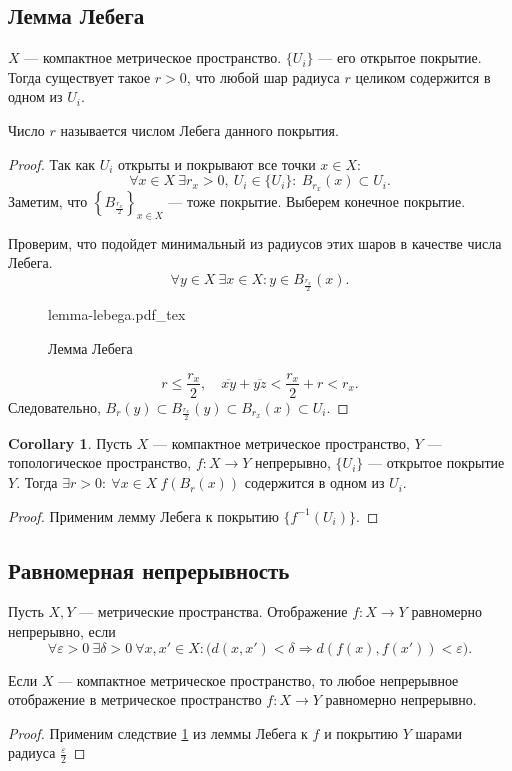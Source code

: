 \documentclass[11pt]{book}
\newcommand{\incfig}[1]{%
    \def\svgwidth{\columnwidth}
    {#1.pdf_tex}
}
\renewcommand{\le}{\leqslant}
\theoremstyle{definition}
\theoremstyle{plain}
\theoremstyle{plain}
\theoremstyle{definition}
\newtheorem*{cor}{Corollary}
\theoremstyle{remark}
\begin{document}
\subsection{Лемма Лебега}
\begin{thm}
    $ X$ --- компактное метрическое пространство.  $ \{U_i\}$ --- его открытое покрытие.
    Тогда существует такое $ r>0$, что любой шар радиуса $ r$ целиком содержится в одном из  $ U_i$.
    \begin{defn}
	Число $ r$ называется {\sf числом Лебега} данного покрытия.
    \end{defn}
\end{thm}
\begin{proof}
    Так как $ U_i$ открыты и покрывают все точки $ x \in X$:
    \[
	\forall x \in X ~ \exists r_x >0, ~ U_i \in  \{U_i\}: ~ B_{r_x}(x) \subset U_i
    .\]
    Заметим, что $ \left\{B_{\frac{r_x}{2}}\right\}_{x \in X}$ --- тоже покрытие. Выберем конечное покрытие.

    Проверим, что подойдет минимальный из радиусов этих шаров в качестве числа Лебега.
    \[
	\forall y \in X ~\exists x \in X: y \in B_{\frac{r_x}{2}}(x)
    .\]
    \begin{figure}[ht]
	\centering
	\incfig{lemma-lebega}
	\caption{Лемма Лебега}
	\label{fig:lemma-lebega}
    \end{figure}
    \[
	r \le  \frac{r_x}{2}, \quad \overline{xy} + \overline{yz} <  \frac{r_x}{2} + r <  r_x
    .\]
    Следовательно, $ B_r (y) \subset B_{\frac{r_x}{2}}(y) \subset B_{r_x}(x) \subset U_i$.
\end{proof}
\begin{cor}\label{cor_ll}
    Пусть $ X$ --- компактное метрическое пространство,  $ Y$ ---  топологическое пространство, $ f: X \to  Y$ непрерывно, $ \{U_i\}$ --- открытое покрытие $ Y$.
    Тогда  $ \exists r >0: ~ \forall x \in  X ~ f(B_r(x)) \text{ содержится в одном из } U_i$.
\end{cor}
\begin{proof}
    Применим лемму Лебега к покрытию $ \{f^{-1}(U_i)\}$.
\end{proof}
\subsection{Равномерная непрерывность}
\begin{defn}
    Пусть $ X, Y$ --- метрические пространства.
    Отображение $ f: X \to  Y$ {\sf равномерно непрерывно}, если
    \[
	\forall  \varepsilon >0 ~ \exists  \delta > 0 ~ \forall x, x' \in  X:  \bigl(d(x, x') < \delta \Longrightarrow  d(f(x), f(x')) < \varepsilon\bigr)
    .\]
\end{defn}
\begin{thm}
    Если $ X$ --- компактное метрическое пространство, то любое непрерывное  отображение в метрическое пространство $ f: X \to  Y$ равномерно непрерывно.
\end{thm}
\begin{proof}
    Применим следствие \ref{cor_ll} из леммы Лебега к $ f$ и покрытию  $ Y$ шарами радиуса $ \frac{ \varepsilon }{2}$
\end{proof}
\end{document}
